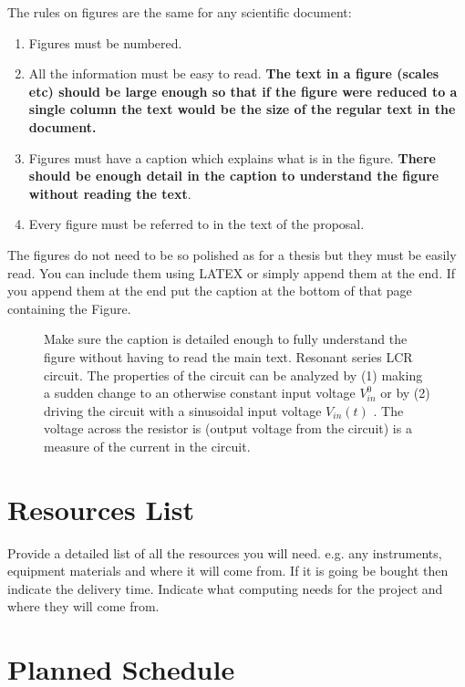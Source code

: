 \documentclass[draft, twocolumn,showpacs,preprintnumbers,amsmath,amssymb]{revtex4}
\begin{document}
The rules on figures are the same for any scientific document:
\begin{enumerate}
    \item Figures must be numbered.
    \item All the information must be easy to read. {\bf The text in a figure (scales etc) 
    should  be  large enough  so that if the figure were reduced to a single
    column the text would be the size of the regular text in the document.} 
    \item Figures must have a caption which explains 
    what is in the figure. {\bf There should
be enough detail in the caption to understand the figure without
reading the text}. 
\item Every figure must be referred to in the text of the proposal.
\end{enumerate}

The figures do not need to be so polished as for a thesis but they must 
be easily read. You can include them using LATEX or simply append them at the end. 
If you append them at the end put the caption at the bottom of that page 
containing the Figure. 
\begin{figure}[h!]
    \centering
    \caption{Make sure the caption  is detailed enough  to fully understand the figure  without having to read the main  text. Resonant series LCR circuit. The properties of the circuit can be analyzed by (1)  making a sudden  change to an otherwise constant input voltage $V_{in}^0$ or by (2)  driving the circuit with a sinusoidal input  voltage  $V_{in}(t)$ . The voltage across the resistor is  (output voltage from the circuit) is a measure of the current in the circuit. }
    
    \label{fig:LCR}       %
\end{figure}

\section{Resources List}


Provide a detailed list of all the resources you will need. e.g. any instruments, equipment materials  and where it will come from. If it is going be bought then indicate the delivery time. Indicate what computing needs for the project and where they will come from.  \cite{albayar2019biomarkers}

\section{Planned Schedule}





    
\end{document}
